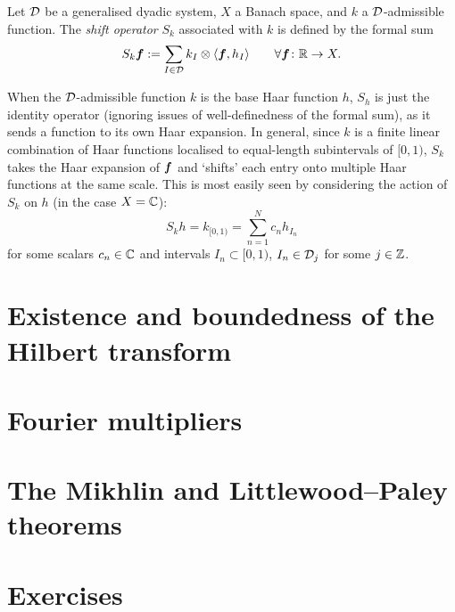 
\begin{defn}
  Let $\mathcal{D}$ be a generalised dyadic system, $X$ a Banach space, and $k$ a $\mathcal{D}$-admissible function.
  The \emph{shift operator} $S_{k}$ associated with $k$ is defined by the formal sum
  \begin{equation*}
    S_{k} \bm{f} := \sum_{I \in \mathcal{D}} k_{I} \otimes \langle \bm{f}, h_{I} \rangle \qquad \forall \bm{f} \colon \mathbb{R} \rightarrow X.
  \end{equation*}
\end{defn}

When the $\mathcal{D}$-admissible function $k$ is the base Haar function $h$, $S_{h}$ is just the identity operator (ignoring issues of well-definedness of the formal sum), as it sends a function to its own Haar expansion.
In general, since $k$ is a finite linear combination of Haar functions localised to equal-length subintervals of $[0,1)$, $S_{k}$ takes the Haar expansion of $\bm{f}$ and `shifts' each entry onto multiple Haar functions at the same scale.
This is most easily seen by considering the action of $S_{k}$ on $h$ (in the case $X = \mathbb{C}$):
\begin{equation*}
  S_{k} h = k_{[0,1)} = \sum_{n=1}^{N} c_{n} h_{I_{n}}
\end{equation*}
for some scalars $c_{n} \in \mathbb{C}$ and intervals $I_{n} \subset [0,1)$, $I_{n} \in \mathcal{D}_{j}$ for some $j \in \mathbb{Z}$.

\begin{thm}
  
\end{thm}

\section{Existence and boundedness of the Hilbert transform}

\section{Fourier multipliers}

\section{The Mikhlin and Littlewood--Paley  theorems}

\section{Exercises}

